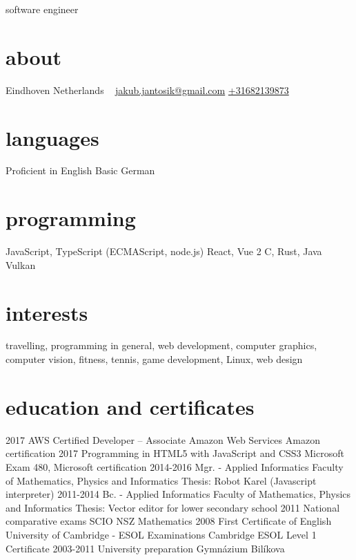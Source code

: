 \documentclass[]{friggeri-cv}
\begin{document}
{software engineer}

\begin{aside}
  \section{about}
  Eindhoven
  Netherlands
  ~
  \href{mailto:jakub.jantosik@gmail.com}{jakub.jantosik@gmail.com}
  \href{tel:+31682139873}{+31682139873}
  \section{languages}
  Proficient in English
  Basic German
  \section{programming}
  JavaScript, TypeScript
  (ECMAScript, node.js)
  React, Vue 2
  C, Rust, Java
  Vulkan
\end{aside}

\section{interests}

travelling, programming in general, web development, computer graphics, computer vision, fitness, tennis, game development, Linux,  web design

\section{education and certificates}

\begin{entrylist}
  \entry
  {2017}
  {AWS Certified Developer – Associate}
  {Amazon Web Services}
  {Amazon certification}
  \entry
  {2017}
  {Programming in HTML5 with JavaScript and CSS3}
  {Microsoft}
  {Exam 480, Microsoft certification}
  \entry
  {2014-2016}
  {Mgr. - Applied Informatics}
  {Faculty of Mathematics, Physics and Informatics}
  {Thesis: Robot Karel (Javascript interpreter)}
  \entry
  {2011-2014}
  {Bc. - Applied Informatics}
  {Faculty of Mathematics, Physics and Informatics}
  {Thesis: Vector editor for lower secondary school}
  \entry
  {2011}
  {National comparative exams}
  {SCIO}
  {NSZ Mathematics}
  \entry
  {2008}
  {First Certificate of English}
  {University of Cambridge - ESOL Examinations}
  {Cambridge ESOL Level 1 Certificate}
  \entry
  {2003-2011}
  {University preparation}
  {Gymnázium Bilíkova}
  {}
\end{entrylist}
\end{document}
